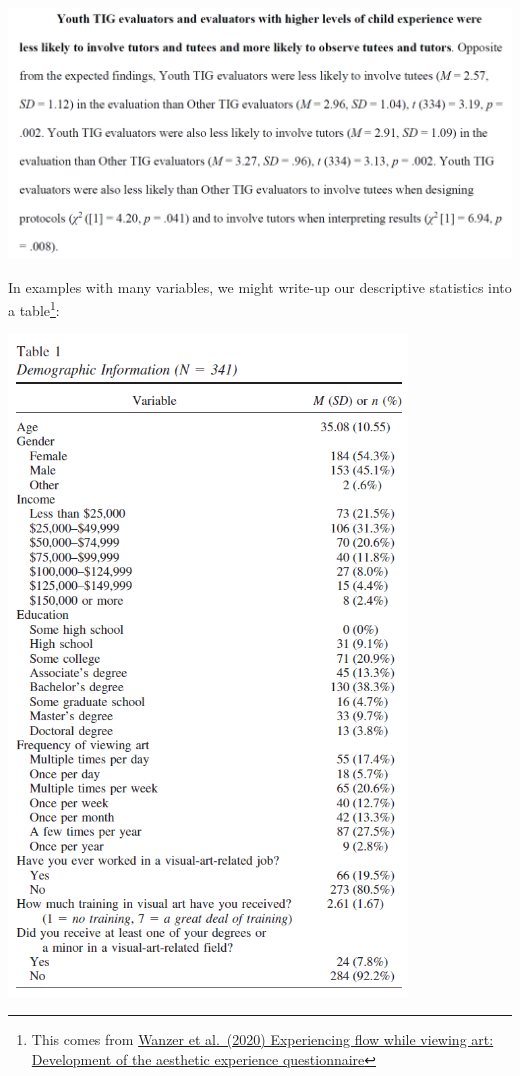 \documentclass[
]{book}
\begin{document}
\includegraphics[width=6.27083in,height=\textheight]{images/02-stats-foundations/example1.png}

In examples with many variables, we might write-up our descriptive statistics into a table\footnote{This comes from \href{https://psycnet.apa.org/record/2018-49650-001}{Wanzer et al.~(2020) Experiencing flow while viewing art: Development of the aesthetic experience questionnaire}}:

\includegraphics[width=4.16667in,height=\textheight]{images/02-stats-foundations/example2.png}
\end{document}
